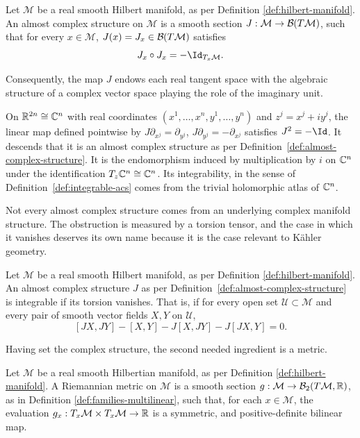 \begin{definition}
	\label{def:almost-complex-structure}
	Let $\mathcal{M}$ be a real smooth Hilbert manifold, as per Definition \ref{def:hilbert-manifold}. An almost complex structure on $\mathcal{M}$ is a smooth section $J: \mathcal{M} \to \B(T\mathcal{M})$, such that for every $x \in \mathcal{M}$, $J(x) = J_x \in \B(T\mathcal{M})$ satisfies $$J_x \circ J_x = -\Id_{T_x\mathcal{M}}.$$
\end{definition}

Consequently, the map $J$ endows each real tangent space with the algebraic structure of a complex vector space playing the role of the imaginary unit.

\begin{example}
	On $\mathbb{R}^{2n}\cong\mathbb{C}^n$ with real coordinates $(x^1,\dots,x^n,y^1,\dots,y^n)$
	and $z^j=x^j+iy^j$, the linear map defined pointwise by
	$J\partial_{x^j}=\partial_{y^j}$, $J\partial_{y^j}=-\partial_{x^j}$
	satisfies $J^2=-\Id$. It descends that it is an almost complex structure as per
	Definition~\ref{def:almost-complex-structure}. It is the
	endomorphism induced by multiplication by $i$ on $\mathbb{C}^n$ under the identification $T_z\mathbb{C}^n\cong\mathbb{C}^n$. Its integrability, in the sense of Definition~\ref{def:integrable-acs} comes from the trivial holomorphic atlas of $\mathbb{C}^n$.
\end{example}

\noindent Not every almost complex structure comes from an underlying complex manifold structure. The obstruction is measured by a torsion tensor, and the case in which it vanishes deserves its own name because it is the case relevant to Kähler geometry.

\begin{definition}
	\label{def:integrable-acs}
	Let $\mathcal{M}$ be a real smooth Hilbert manifold, as per Definition \ref{def:hilbert-manifold}. An almost complex structure $J$ as per Definition~\ref{def:almost-complex-structure} is integrable if its torsion vanishes. That is, if for every open set $\mathcal{U}\subset\mathcal{M}$ and every pair of smooth vector fields $X,Y$ on $\mathcal{U}$,
	\[
		[JX,JY]-[X,Y]-J[X,JY]-J[JX,Y]=0.
	\]
\end{definition}

\noindent Having set the complex structure, the second needed ingredient is a metric. 

\begin{definition}
	\label{def:riemannian-metric}
	Let $\mathcal{M}$ be a real smooth Hilbertian manifold, as per Definition \ref{def:hilbert-manifold}. A Riemannian metric on $\mathcal{M}$ is a smooth section $g: \mathcal{M} \to \B_2(T\mathcal{M}, \R)$, as in Definition \ref{def:families-multilinear}, such that, for each $x \in \mathcal{M}$, the evaluation $g_x : T_x\mathcal{M} \times T_x\mathcal{M} \to \R$ is a symmetric, and positive-definite bilinear map. 
\end{definition}

